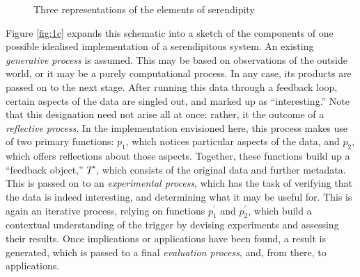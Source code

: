 \afterpage{\clearpage}
\begin{figure}[p]
\vspace{2mm}
\begin{minipage}[b]{\textwidth}
{\centering


\par}
\vspace{-4mm}
\label{fig:1a}
\end{minipage}
\medskip

\begin{minipage}[b]{\textwidth}
{\centering

\par}
\label{fig:1b}
\end{minipage}
\medskip

\begin{minipage}[b]{\textwidth}
{\centering


\par}
\smallskip

\label{fig:1c}
\end{minipage}
\bigskip

\caption{Three representations of the elements of serendipity}\label{fig:model}
\end{figure}

Figure \ref{fig:1c} expands this schematic into a sketch of the
components of one possible idealised implementation of a serendipitous
system.  An existing \emph{generative process} is assumed.  This may
be based on observations of the outside world, or it may be a purely
computational process.  In any case, its products are passed on to the
next stage.  After running this data through a feedback loop, certain
aspects of the data are singled out, and marked up as
``interesting.''  Note that this designation need not arise all at
once: rather, it the outcome of a \emph{reflective process}.  In the
implementation envisioned here, this process makes use of two primary
functions: $p_1$, which notices particular aspects of the data, and $p_2$, which
offers reflections about those aspects.  Together, these functions build up a
``feedback object,'' $T^{\star}$, which consists of the original data
and further metadata.  This is passed on to an \emph{experimental
  process}, which has the task of verifying that the data
is indeed interesting, and determining what it may be useful for.
This is again an iterative process, relying on functions $p^{\prime}_1$ and $p^{\prime}_2$, which
build a contextual understanding of the trigger by devising experiments and
assessing their results.  Once implications or applications have been found, a result is
generated, which is passed to a final \emph{evaluation process}, and,
from there, to applications.

